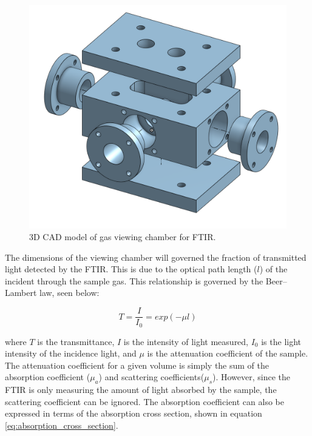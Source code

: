 \begin{figure}[h!]
	\centering
	\includegraphics[width=0.8\linewidth]{chapter_4/figures/ftir_box.png}
	\caption{3D CAD model of gas viewing chamber for FTIR.}
	\label{fig:ftir_box}
\end{figure}


The dimensions of the viewing chamber will governed the fraction of transmitted light detected by the FTIR. This is due to the optical path length ($l$) of the incident through the sample gas. This relationship is governed by the Beer–Lambert law, seen below:

\begin{equation}
    T = \frac{I}{I_0} = exp(-\mu l)
    \label{eq:beer_lambert_law}
\end{equation}

where $T$ is the transmittance, $I$ is the intensity of light measured, $I_0$ is the light intensity of the incidence light, and $\mu$ is the attenuation coefficient  of the sample. The attenuation coefficient for a given volume is simply the sum of the absorption coefficient ($\mu_a$) and scattering coefficients($\mu_s$). However, since the FTIR is only measuring the amount of light absorbed by the sample, the scattering coefficient can be ignored. The absorption coefficient can also be expressed in terms of the absorption cross section, shown in equation \ref{eq:absorption_cross_section}.

